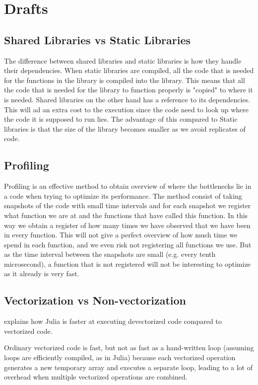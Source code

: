 \chapter{Drafts}
\section{Shared Libraries vs Static Libraries}
The difference between shared libraries and static libraries is how they handle their dependencies. When static libraries are compiled, all the code that is needed for the functions in the library is compiled into the library. This means that all the code that is needed for the library to function properly is "copied" to where it is needed. Shared libraries on the other hand has a reference to its dependencies. This will ad an extra cost to the execution since the code need to look up where the code it is supposed to run lies. The advantage of this compared to Static libraries is that the size of the library becomes smaller as we avoid replicates of code.

\section{Profiling}
Profiling is an effective method to obtain overview of where the bottlenecks lie in a code when trying to optimize its performance. The method consist of taking snapshots of the code with small time intervals and for each snapshot we register what function we are at and the functions that have called this function. In this way we obtain a register of how many times we have observed that we have been in every function. This will not give a perfect overview of how much time we spend in each function, and we even risk not registering all functions we use. But as the time interval between the snapshots are small (e.g. every tenth microsecond), a function that is not registered will not be interesting to optimize as it already is very fast. 

\section{Vectorization vs Non-vectorization}
\emph{\citep{Vectorization}} explains how Julia is faster at executing devectorized code compared to vectorized code.

\emph{\citep{MoreDotsJuliaBlog}}
Ordinary vectorized code is fast, but not as fast as a hand-written loop (assuming loops are efficiently compiled, as in Julia) because each vectorized operation generates a new temporary array and executes a separate loop, leading to a lot of overhead when multiple vectorized operations are combined.

